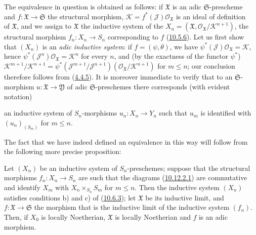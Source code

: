 The equivalence in question is obtained as follows: if
$\mathfrak{X}$ is an adic $\mathfrak{S}$-prescheme and
$f:\mathfrak{X}\to\mathfrak{S}$ the structural morphism,
$\mathscr{K}=f^*(\mathscr{J})\mathscr{O}_{\mathfrak{X}}$ is an ideal of
definition of $\mathfrak{X}$, and we assign to $\mathfrak{X}$ the
inductive system of the
$X_n=(\mathfrak{X},\mathscr{O}_{\mathfrak{X}}/\mathscr{K}^{n+1})$, the
structural morphism $f_n:X_n\to S_n$ corresponding to $f$
(\hyperref[I.10.5.6]{10.5.6}). Let us first show that $(X_n)$ is an
\emph{adic inductive system}: if $f=(\psi,\theta)$, we have
$\psi^*(\mathscr{J})\mathscr{O}_{\mathfrak{X}}=\mathscr{K}$, hence
$\psi^*(\mathscr{J}^n)\mathscr{O}_{\mathfrak{X}}=\mathscr{K}^n$ for every
$n$, and (by the exactness of the functor $\psi^*$)
$\mathscr{K}^{m+1}/\mathscr{K}^{n+1}
=\psi^*(\mathscr{J}^{m+1}/\mathscr{J}^{n+1})
(\mathscr{O}_{\mathfrak{X}}/\mathscr{K}^{n+1})$ for $m\leq n$; our
conclusion therefore follows from (\hyperref[I.4.4.5]{4.4.5}). It is
moreover immediate to verify that to an $\mathfrak{S}$-morphism
$u:\mathfrak{X}\to\mathfrak{Y}$ of adic $\mathfrak{S}$-preschemes
there corresponds (with evident notation)


an inductive system of $S_n$-morphisms $u_n:X_n\to Y_n$ such that $u_m$
is identified with $(u_n)_{(S_m)}$ for $m\leq n$.

The fact that we have indeed defined an equivalence in this way will
follow from the following more precise proposition:

\begin{proposition}[10.12.3.1]
\label{I.10.12.3.1}
Let $(X_n)$ be an inductive system of $S_n$-preschemes; suppose that the
structural morphisms $f_n:X_n\to S_n$ are such that the diagrams
(\hyperref[I.10.12.2.1]{10.12.2.1}) are commutative and identify
$X_m$ with $X_n\times_{S_n}S_m$ for $m\leq n$. Then the inductive system
$(X_n)$ satisfies conditions b) and c) of
(\hyperref[I.10.6.3]{10.6.3}); let $\mathfrak{X}$ be its inductive limit,
and $f:\mathfrak{X}\to\mathfrak{S}$ the morphism that is the inductive limit
of the inductive system $(f_n)$. Then, if $X_0$ is locally Noetherian,
$\mathfrak{X}$ is locally Noetherian and $f$ is an adic morphism.
\end{proposition}

